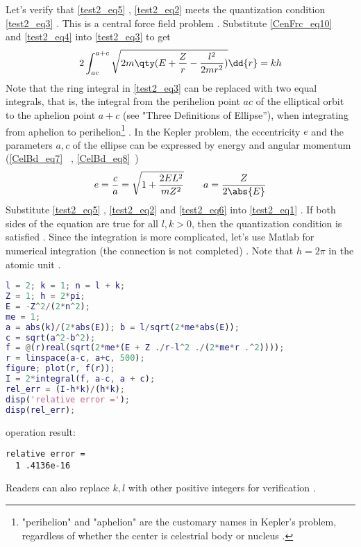 Let's verify that \autoref{test2_eq5} , \autoref{test2_eq2} meets the quantization condition \autoref{test2_eq3} . This is a central force field problem . Substitute \autoref{CenFrc_eq10}~ and \autoref{test2_eq4} into \autoref{test2_eq3} to get
\begin{equation}\label{test2_eq1}
2\int_{ac}^{a+c} \sqrt{2m\qty(E + \frac{Z}{r}-\frac{l^2}{2mr^2})} \dd{r} = kh
\end{equation}
Note that the ring integral in \autoref{test2_eq3} can be replaced with two equal integrals, that is, the integral from the perihelion point $ac$ of the elliptical orbit to the aphelion point $a+c$ (see "Three Definitions of Ellipse”), when integrating from aphelion to perihelion\footnote{"perihelion" and "aphelion" are the customary names in Kepler's problem, regardless of whether the center is celestrial body or nucleus . } . In the Kepler problem, the eccentricity $e$ and the parameters $a, c$ of the ellipse can be expressed by energy and angular momentum (\autoref{CelBd_eq7}~ , \autoref{CelBd_eq8}~)
\begin{equation}\label{test2_eq6}
e = \frac{c}{a} = \sqrt{1 + \frac{2EL^2}{mZ^2}}
\qquad
a = \frac{Z}{2\abs{E}}
\end{equation}
Substitute \autoref{test2_eq5} , \autoref{test2_eq2} and \autoref{test2_eq6} into \autoref{test2_eq1} . If both sides of the equation are true for all $l,k> 0$, then the quantization condition is satisfied . Since the integration is more complicated, let's use Matlab for numerical integration (the connection is not completed) . Note that $h = 2\pi$ in the atomic unit .
\begin{lstlisting}[language=matlab]
l = 2; k = 1; n = l + k;
Z = 1; h = 2*pi;
E = -Z^2/(2*n^2);
me = 1;
a = abs(k)/(2*abs(E)); b = l/sqrt(2*me*abs(E));
c = sqrt(a^2-b^2);
f = @(r)real(sqrt(2*me*(E + Z ./r-l^2 ./(2*me*r .^2))));
r = linspace(a-c, a+c, 500);
figure; plot(r, f(r));
I = 2*integral(f, a-c, a + c);
rel_err = (I-h*k)/(h*k);
disp('relative error =');
disp(rel_err);
\end{lstlisting}
operation result: 
\begin{lstlisting}[language=matlabC]
relative error =
  1 .4136e-16
\end{lstlisting}
Readers can also replace $k, l$ with other positive integers for verification .

